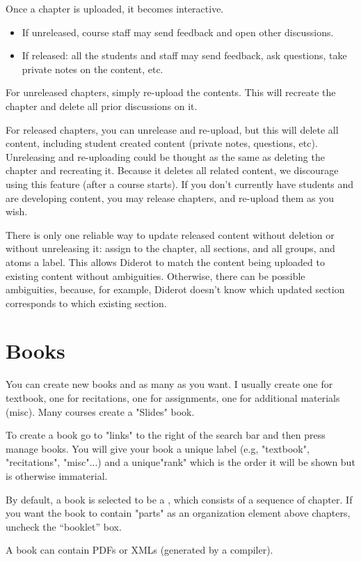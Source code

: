 \begin{gram}
Once a chapter is uploaded, it becomes interactive.

\begin{itemize}
\item
If unreleased, course staff may send feedback and open other discussions. 
\item
If released: all the students and staff may send feedback, ask questions, take private notes on the content, etc.
\end{itemize}
\end{gram}


\begin{gram}
For unreleased chapters, simply re-upload the contents.  This will
recreate the chapter and delete all prior discussions on it.  

For released chapters, you can unrelease and re-upload, but this will
delete all content, including student created content (private notes,
questions, etc). 
%
Unreleasing and re-uploading could be thought as the same as deleting the chapter and recreating it.
%
Because it deletes all related content, we discourage using this
feature (after a course starts).  If you don't currently have students and are developing content, you may release chapters, and re-upload them as you wish.

There is only one reliable way to update released content without deletion or without unreleasing it: assign to the chapter, all sections, and all groups, and atoms a label.  This allows Diderot to match the content being uploaded to existing content without ambiguities.  Otherwise, there can be possible ambiguities, because, for example, Diderot doesn't know which updated section corresponds to which existing section. 
\end{gram}

\section{Books}
\label{guide:books}

\begin{gram}
You can create new books and as many as you want.  I usually create one for textbook, one for recitations, one for assignments, one for additional materials (misc).  Many courses create a "Slides" book.  

To create a book go to "links" to the right of the search bar and then press
manage books.  You will give your book a unique label (e.g,
"textbook", "recitations", "misc"...) and a unique"rank" which is the
order it will be shown but is otherwise immaterial.  

By default, a book is selected to be a , which
consists of a sequence of chapter.  
%
If you want the book to contain "parts" as an organization element
above chapters, uncheck the ``booklet'' box.  

A book can contain PDFs or XMLs (generated by a compiler).
\end{gram}

